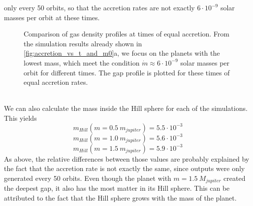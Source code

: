       only every 50 orbits, so 
      that the accretion rates are not exactly $6\cdot10^{-9}$ solar masses per 
      orbit at these times.
      \begin{figure}[h!]
        \centering
        \begin{minipage}{.5\linewidth}
          \centering
        \end{minipage}%
        \begin{minipage}{.5\linewidth}
          \centering
        \end{minipage}
        \caption{
          Comparison of gas density profiles at times of equal accretion. 
          From the simulation results already shown in 
          \autoref{fig:accretion_vs_t_and_m0}a, we focus on the planets with 
          the lowest mass, which meet the condition 
          $\dot{m}\approx6\cdot10^{-9}$ solar masses per orbit for 
          different times. The gap profile is plotted for these times of
          equal accretion rates. %
        }
        \label{fig:comparing_gap_for_times_of_equal_acc}
      \end{figure} \ \\

    \clearpage \noindent
    We can also calculate the mass inside the Hill sphere for each of the 
    simulations. This yields 
    $$m_{Hill}(m=0.5\ m_{jupiter})=5.5\cdot10^{-3}$$
    $$m_{Hill}(m=1.0\ m_{jupiter})=5.6\cdot10^{-3}$$
    $$m_{Hill}(m=1.5\ m_{jupiter})=5.9\cdot10^{-3}$$
    As above, the relative differences between those values are probably 
    explained by the fact that the accretion rate is not exactly the same,
    since outputs were only generated every 50 orbits. Even though the planet 
    with $m=1.5\ M_{jupiter}$ created the deepest gap, it also has the most 
    matter in its Hill sphere. This can be attributed to the fact that the 
    Hill sphere grows with the mass of the planet.
